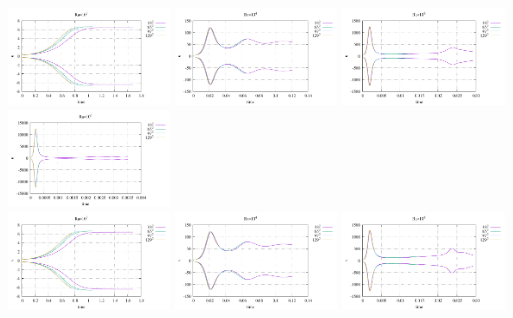 \begin{center}
\includegraphics[width=4.297cm]{python_codes/fieldstone_155/results/stats_u_Ra1e3}
\includegraphics[width=4.297cm]{python_codes/fieldstone_155/results/stats_u_Ra1e4}
\includegraphics[width=4.297cm]{python_codes/fieldstone_155/results/stats_u_Ra1e5}
\includegraphics[width=4.297cm]{python_codes/fieldstone_155/results/stats_u_Ra1e6}\\
\includegraphics[width=4.297cm]{python_codes/fieldstone_155/results/stats_v_Ra1e3}
\includegraphics[width=4.297cm]{python_codes/fieldstone_155/results/stats_v_Ra1e4}
\includegraphics[width=4.297cm]{python_codes/fieldstone_155/results/stats_v_Ra1e5}

\end{center}

